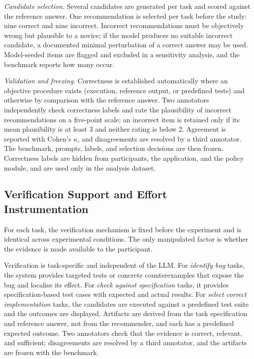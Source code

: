 \documentclass[oneside,final,14pt,a4paper]{extreport}
\begin{document}
\emph{Candidate selection.} Several candidates are generated per task and
scored against the reference answer. One recommendation is selected per task
before the study: nine correct and nine incorrect. Incorrect recommendations
must be objectively wrong but plausible to a novice; if the model produces no
suitable incorrect candidate, a documented minimal perturbation of a correct
answer may be used. Model-seeded items are flagged and excluded in a
sensitivity analysis, and the benchmark reports how many occur.

\emph{Validation and freezing.} Correctness is established automatically where
an objective procedure exists (execution, reference output, or predefined
tests) and otherwise by comparison with the reference answer. Two annotators
independently check correctness labels and rate the plausibility of incorrect
recommendations on a five-point scale; an incorrect item is retained only if
its mean plausibility is at least 3 and neither rating is below 2. Agreement is
reported with Cohen's $\kappa$, and disagreements are resolved by a third
annotator. The benchmark, prompts, labels, and selection decisions are then
frozen. Correctness labels are hidden from participants, the application, and
the policy module, and are used only in the analysis dataset.


\subsection{Verification Support and Effort Instrumentation}
\label{subsec:burden}

For each task, the verification mechanism is fixed before the experiment and is
identical across experimental conditions. The only manipulated factor is
whether the evidence is made available to the participant.

Verification is task-specific and independent of the LLM. For \emph{identify
bug} tasks, the system provides targeted tests or concrete counterexamples that
expose the bug and localise its effect. For \emph{check against specification}
tasks, it provides specification-based test cases with expected and actual
results. For \emph{select correct implementation} tasks, the candidates are
executed against a predefined test suite and the outcomes are displayed.
Artifacts are derived from the task specification and reference answer, not
from the recommender, and each has a predefined expected outcome. Two annotators
check that the evidence is correct, relevant, and sufficient; disagreements are
resolved by a third annotator, and the artifacts are frozen with the benchmark.
\end{document}
